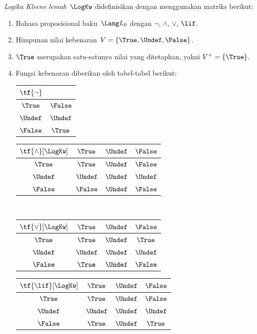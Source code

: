 \documentclass[../../../include/open-logic-section]{subfiles}
\begin{document}
\begin{defn}
\emph{Logika Kleene lemah}~$\LogKw$ didefinisikan dengan menggunakan matriks
berikut:
\begin{enumerate}
  \item Bahasa proposisional baku~$\Lang L_0$ dengan $\lnot$, $\land$,
  $\lor$, $\lif$.
  \item Himpunan nilai kebenaran~$V=\{\True,\Undef,\False\}$.
  \item $\True$ merupakan satu-satunya nilai yang ditetapkan, yakni
  $V^+=\{\True\}$.
  \item Fungsi kebenaran diberikan oleh tabel-tabel berikut:
  \begin{center}
    \begin{tabular}{c|c}
      $\tf{\lnot}$ & \\
      \hline
      $\True$ & $\False$ \\
      $\Undef$ & $\Undef$ \\
      $\False$ & $\True$
    \end{tabular}
    \quad
    \begin{tabular}{c|ccc}
      $\tf{\land}[\LogKw]$ & $\True$ & $\Undef$ & $\False$ \\
      \hline
      $\True$ & $\True$ & $\Undef$ & $\False$ \\
      $\Undef$ & $\Undef$ & $\Undef$ & $\Undef$\\
      $\False$ & $\False$ & $\Undef$ & $\False$
    \end{tabular}
    \\[2ex]
    \begin{tabular}{c|ccc}
      $\tf{\lor}[\LogKw]$ & $\True$ & $\Undef$ & $\False$ \\
      \hline
      $\True$ & $\True$ & $\Undef$ & $\True$ \\
      $\Undef$ & $\Undef$ & $\Undef$ & $\Undef$ \\
      $\False$ & $\True$ & $\Undef$ & $\False$
    \end{tabular}
    \quad
    \begin{tabular}{c|ccc}
      $\tf{\lif}[\LogKw]$ & $\True$ & $\Undef$ & $\False$ \\
      \hline
      $\True$ & $\True$ & $\Undef$ & $\False$ \\
      $\Undef$ & $\Undef$ & $\Undef$ & $\Undef$  \\
      $\False$ & $\True$ & $\Undef$ & $\True$
    \end{tabular}
  \end{center}
\end{enumerate}
\end{defn}
\end{document}
